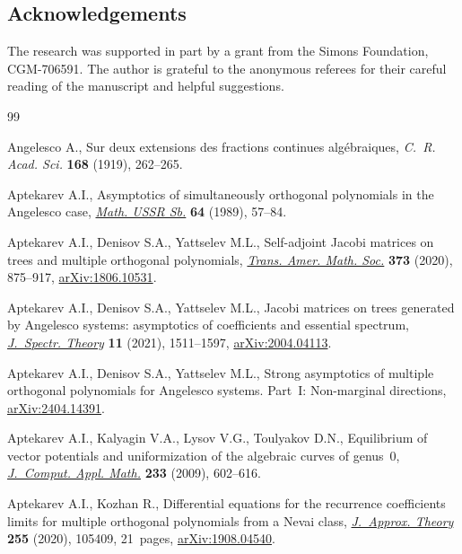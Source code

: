 \documentclass[pdftex]{sigma}
\numberwithin{equation}{section}
\begin{document}
\subsection*{Acknowledgements}

The research was supported in part by a grant from the Simons Foundation, CGM-706591. The author is grateful to the anonymous referees for their careful reading of the manuscript and helpful suggestions.

\begin{thebibliography}{99}
\footnotesize\itemsep=0pt

Angelesco A., Sur deux extensions des fractions continues alg\'ebraiques,
 \textit{C.~R. Acad. Sci.} \textbf{168} (1919), 262--265.

Aptekarev A.I., Asymptotics of simultaneously orthogonal polynomials in the
 {A}ngelesco case,
 \href{https://doi.org/10.1070/SM1989v064n01ABEH003294}{\textit{Math. USSR
 Sb.}} \textbf{64} (1989), 57--84.

Aptekarev A.I., Denisov S.A., Yattselev M.L., Self-adjoint {J}acobi matrices on
 trees and multiple orthogonal polynomials,
 \href{https://doi.org/10.1090/tran/7959}{\textit{Trans. Amer. Math. Soc.}}
 \textbf{373} (2020), 875--917, \href{http://arxiv.org/abs/1806.10531}{arXiv:1806.10531}.

Aptekarev A.I., Denisov S.A., Yattselev M.L., Jacobi matrices on trees
 generated by {A}ngelesco systems: asymptotics of coefficients and essential
 spectrum, \href{https://doi.org/10.4171/jst/380}{\textit{J.~Spectr. Theory}}
 \textbf{11} (2021), 1511--1597, \href{http://arxiv.org/abs/2004.04113}{arXiv:2004.04113}.

Aptekarev A.I., Denisov S.A., Yattselev M.L., Strong asymptotics of multiple
 orthogonal polynomials for {A}ngelesco systems. {P}art~{I}: {N}on-marginal
 directions, \href{http://arxiv.org/abs/2404.14391}{arXiv:2404.14391}.
 
Aptekarev A.I., Kalyagin V.A., Lysov V.G., Toulyakov D.N., Equilibrium of
 vector potentials and uniformization of the algebraic curves of genus~0,
 \href{https://doi.org/10.1016/j.cam.2009.02.080}{\textit{J.~Comput. Appl.
 Math.}} \textbf{233} (2009), 602--616.

Aptekarev A.I., Kozhan R., Differential equations for the recurrence
 coefficients limits for multiple orthogonal polynomials from a {N}evai class,
 \href{https://doi.org/10.1016/j.jat.2020.105409}{\textit{J.~Approx. Theory}}
 \textbf{255} (2020), 105409, 21~pages, \href{http://arxiv.org/abs/1908.04540}{arXiv:1908.04540}.


\end{thebibliography}
\end{document}
